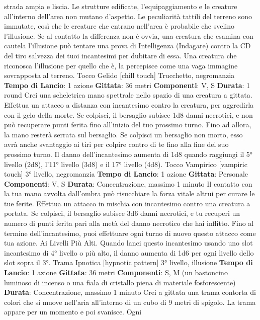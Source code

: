 \begin{multicols}{2}
strada ampia e liscia. Le strutture edificate,
l’equipaggiamento e le creature all’interno dell’area non
mutano d’aspetto.
Le peculiarità tattili del terreno sono immutate, così che
le creature che entrano nell’area è probabile che
svelino l’illusione. Se al contatto la differenza non è
ovvia, una creatura che esamina con cautela l’illusione
può tentare una prova di Intelligenza (Indagare) contro
la CD del tiro salvezza dei tuoi incantesimi per dubitare
di essa. Una creatura che riconosca l’illusione per
quello che è, la percepisce come una vaga immagine
sovrapposta al terreno.
Tocco Gelido
[chill touch]
Trucchetto, negromanzia
\textbf{Tempo di Lancio}: 1 azione
\textbf{Gittata}: 36 metri
\textbf{Componenti}: V, S
\textbf{Durata}: 1 round
Crei una scheletrica mano spettrale nello spazio di una
creatura a gittata. Effettua un attacco a distanza con
incantesimo contro la creatura, per aggredirla con il
gelo della morte. Se colpisci, il bersaglio subisce 1d8
danni necrotici, e non può recuperare punti ferita fino
all’inizio del tuo prossimo turno. Fino ad allora, la mano
resterà serrata sul bersaglio.
Se colpisci un bersaglio non morto, esso avrà anche
svantaggio ai tiri per colpire contro di te fino alla fine del
suo prossimo turno.
Il danno dell’incantesimo aumenta di 1d8 quando
raggiungi il 5° livello (2d8), l’11° livello (3d8) e il 17°
livello (4d8).
Tocco Vampirico
[vampiric touch]
3° livello, negromanzia
\textbf{Tempo di Lancio}: 1 azione
\textbf{Gittata}: Personale
\textbf{Componenti}: V, S
\textbf{Durata}: Concentrazione, massimo 1 minuto
Il contatto con la tua mano avvolta dall’ombra può
risucchiare la forza vitale altrui per curare le tue ferite.
Effettua un attacco in mischia con incantesimo contro
una creatura a portata. Se colpisci, il bersaglio subisce
3d6 danni necrotici, e tu recuperi un numero di punti
ferita pari alla metà del danno necrotico che hai inflitto.
Fino al termine dell’incantesimo, puoi effettuare ogni
turno di nuovo questo attacco come tua azione.
Ai Livelli Più Alti. Quando lanci questo incantesimo
usando uno slot incantesimo di 4° livello o più alto, il
danno aumenta di 1d6 per ogni livello dello slot sopra il
3°.
Trama Ipnotica
[hypnotic pattern]
3° livello, illusione
\textbf{Tempo di Lancio}: 1 azione
\textbf{Gittata}: 36 metri
\textbf{Componenti}: S, M (un bastoncino luminoso di incenso
o una fiala di cristallo piena di materiale fosforescente)
\textbf{Durata}: Concentrazione, massimo 1 minuto
Crei a gittata una trama contorta di colori che si muove
nell’aria all’interno di un cubo di 9 metri di spigolo. La
trama appare per un momento e poi svanisce. Ogni

\end{multicols}
